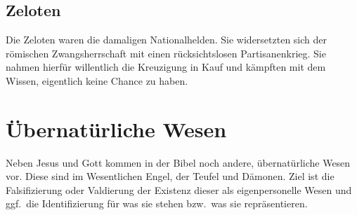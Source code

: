 \subsection{Zeloten}
Die Zeloten waren die damaligen Nationalhelden. Sie widersetzten sich der römischen Zwangsherrschaft mit einen rücksichtslosen Partisanenkrieg. 
Sie nahmen hierfür willentlich die Kreuzigung in Kauf und kämpften mit dem Wissen, eigentlich keine Chance zu haben.

\section{Übernatürliche Wesen}
Neben Jesus und Gott kommen in der Bibel noch andere, übernatürliche Wesen vor. Diese sind im Wesentlichen Engel, der Teufel und Dämonen. Ziel 
ist die Falsifizierung oder Valdierung der Existenz dieser als eigenpersonelle Wesen und ggf.\ die Identifizierung für was sie stehen bzw.\ was sie repräsentieren.

